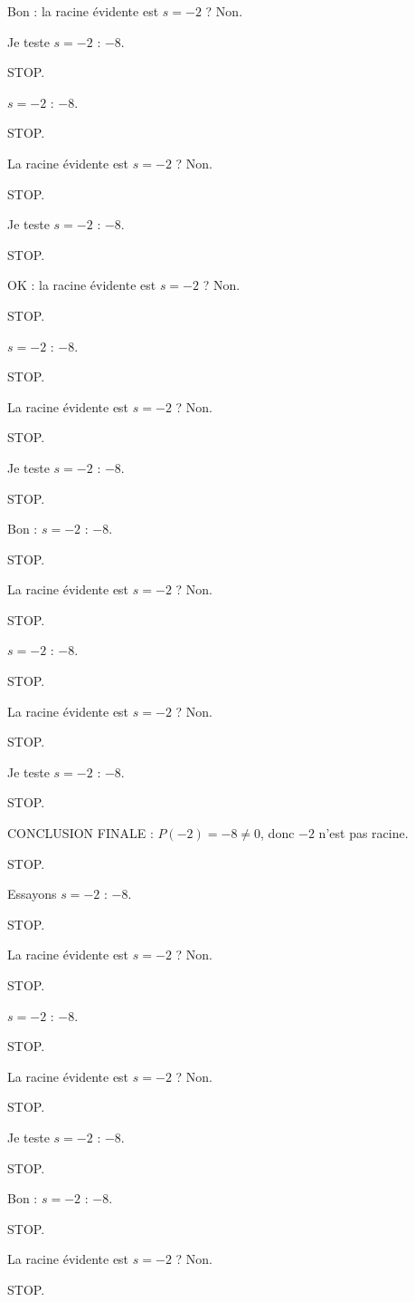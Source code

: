\documentclass[11pt]{article}
\begin{document}
\begin{exoresolu}
\begin{enumerate}
Bon : la racine évidente est $s = -2$ ? Non. 

Je teste $s = -2$ : $-8$. 

STOP. 

$s = -2$ : $-8$. 

STOP. 

La racine évidente est $s = -2$ ? Non. 

STOP. 

Je teste $s = -2$ : $-8$. 

STOP. 

OK : la racine évidente est $s = -2$ ? Non. 

STOP. 

$s = -2$ : $-8$. 

STOP. 

La racine évidente est $s = -2$ ? Non. 

STOP. 

Je teste $s = -2$ : $-8$. 

STOP. 

Bon : $s = -2$ : $-8$. 

STOP. 

La racine évidente est $s = -2$ ? Non. 

STOP. 

$s = -2$ : $-8$. 

STOP. 

La racine évidente est $s = -2$ ? Non. 

STOP. 

Je teste $s = -2$ : $-8$. 

STOP. 

CONCLUSION FINALE : $P(-2) = -8 \neq 0$, donc $-2$ n'est pas racine. 

STOP. 

Essayons $s = -2$ : $-8$. 

STOP. 

La racine évidente est $s = -2$ ? Non. 

STOP. 

$s = -2$ : $-8$. 

STOP. 

La racine évidente est $s = -2$ ? Non. 

STOP. 

Je teste $s = -2$ : $-8$. 

STOP. 

Bon : $s = -2$ : $-8$. 

STOP. 

La racine évidente est $s = -2$ ? Non. 

STOP. 


\end{enumerate}
\end{exoresolu}
\end{document}
